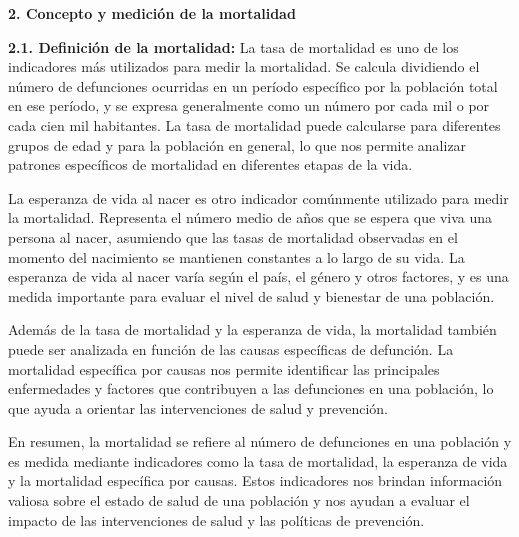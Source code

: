 \documentclass[8pt,a4paper]{beamer}
\begin{document}
{\begin{frame}{\textbf{2. Concepto y medición de la mortalidad}}
\begin{block}{\textbf{2.1. Definición de la mortalidad:}}
La tasa de mortalidad es uno de los indicadores más utilizados para medir la mortalidad. Se calcula dividiendo el número de defunciones ocurridas en un período específico por la población total en ese período, y se expresa generalmente como un número por cada mil o por cada cien mil habitantes. La tasa de mortalidad puede calcularse para diferentes grupos de edad y para la población en general, lo que nos permite analizar patrones específicos de mortalidad en diferentes etapas de la vida.
\end{block}
\end{frame}

\begin{frame}{}
\begin{block}{}
\setlength{\parskip}{3px}
\justifying
La esperanza de vida al nacer es otro indicador comúnmente utilizado para medir la mortalidad. Representa el número medio de años que se espera que viva una persona al nacer, asumiendo que las tasas de mortalidad observadas en el momento del nacimiento se mantienen constantes a lo largo de su vida. La esperanza de vida al nacer varía según el país, el género y otros factores, y es una medida importante para evaluar el nivel de salud y bienestar de una población.

Además de la tasa de mortalidad y la esperanza de vida, la mortalidad también puede ser analizada en función de las causas específicas de defunción. La mortalidad específica por causas nos permite identificar las principales enfermedades y factores que contribuyen a las defunciones en una población, lo que ayuda a orientar las intervenciones de salud y prevención.

En resumen, la mortalidad se refiere al número de defunciones en una población y es medida mediante indicadores como la tasa de mortalidad, la esperanza de vida y la mortalidad específica por causas. Estos indicadores nos brindan información valiosa sobre el estado de salud de una población y nos ayudan a evaluar el impacto de las intervenciones de salud y las políticas de prevención.
\end{block}
\end{frame}


}
\end{document}

